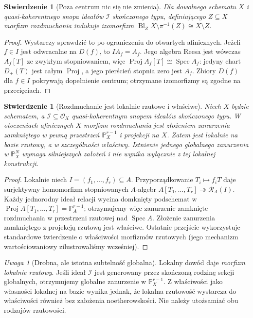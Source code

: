 \documentclass[11pt,a4paper,openany]{report}
\numberwithin{equation}{section}
\theoremstyle{plain}
\newtheorem{stwierdzenie}[twierdzenie]{Stwierdzenie}
\theoremstyle{definition}
\theoremstyle{remark}
\newtheorem{uwaga}[twierdzenie]{Uwaga}
\newcommand{\PP}{\mathbb P}
\newcommand{\Spec}{\operatorname{Spec}}
\begin{document}
\begin{stwierdzenie}[Poza centrum nic się nie zmienia]
\label{st:ga5-off-centre}
Dla dowolnego schematu $X$ i quasi-koherentnego snopa
ideałów $\mathcal I$ skończonego typu, definiującego $Z\subseteq X$
morfizm rozdmuchania indukuje izomorfizm
$\operatorname{Bl}_Z X\setminus\pi^{-1}(Z)\cong X\setminus Z$.
\end{stwierdzenie}
\begin{proof}
Wystarczy sprawdzić to po ograniczeniu do otwartych
afinicznych. Jeżeli $f\in I$ jest odwracalne na $D(f)$,
to $I A_f=A_f$. Jego algebra Reesa jest wówczas
$A_f[T]$ ze zwykłym stopniowaniem, więc
$\operatorname{Proj}A_f[T]\cong\Spec A_f$: jedyny chart
$D_+(T)$ jest całym $\operatorname{Proj}$, a jego
pierścień stopnia zero jest $A_f$. Zbiory $D(f)$
dla $f\in I$ pokrywają dopełnienie centrum; otrzymane
izomorfizmy są zgodne na przecięciach.
\end{proof}

\begin{stwierdzenie}[Rozdmuchanie jest lokalnie rzutowe i właściwe]
\label{st:ga5-blowup-proper}
Niech $X$ będzie schematem, a $\mathcal I\subseteq\mathcal O_X$
quasi-koherentnym snopem ideałów skończonego typu.
W otoczeniach afinicznych $X$ morfizm rozdmuchania jest
złożeniem zanurzenia zamkniętego w pewną przestrzeń
$\PP^{r-1}_X$ i projekcji na $X$. Zatem jest lokalnie
na bazie rzutowy, a w szczególności właściwy. Istnienie
jednego globalnego zanurzenia w $\PP^N_X$ wymaga
silniejszych założeń i nie wynika wyłącznie z tej lokalnej
konstrukcji.
\end{stwierdzenie}
\begin{proof}
Lokalnie niech $I=(f_1,\ldots,f_r)\subseteq A$.
Przyporządkowanie $T_i\mapsto f_iT$ daje surjektywny
homomorfizm stopniowanych $A$-algebr
$A[T_1,\ldots,T_r]\twoheadrightarrow\mathcal R_A(I)$.
Każdy jednorodny ideał relacji wycina domknięty
podschemat w $\operatorname{Proj}A[T_1,\ldots,T_r]
=\PP^{r-1}_A$; otrzymujemy więc zanurzenie zamknięte
rozdmuchania w przestrzeni rzutowej nad $\Spec A$.
Złożenie zanurzenia zamkniętego z projekcją rzutową
jest właściwe. Ostatnie przejście wykorzystuje standardowe
twierdzenie o właściwości morfizmów rzutowych (jego
mechanizm wartościowaniowy zilustrowaliśmy wcześniej).
\end{proof}

\begin{uwaga}[Drobna, ale istotna subtelność globalna]
Lokalny dowód daje \emph{morfizm lokalnie rzutowy}.
Jeśli ideał $\mathcal I$ jest generowany przez skończoną
rodzinę sekcji globalnych, otrzymujemy globalne zanurzenie
w $\PP^{r-1}_X$. Z właściwości jako własności lokalnej
na bazie wynika jednak, że lokalna rzutowość wystarcza
do właściwości również bez założenia noetherowskości.
Nie należy utożsamiać obu rodzajów rzutowości.
\end{uwaga}
\end{document}
